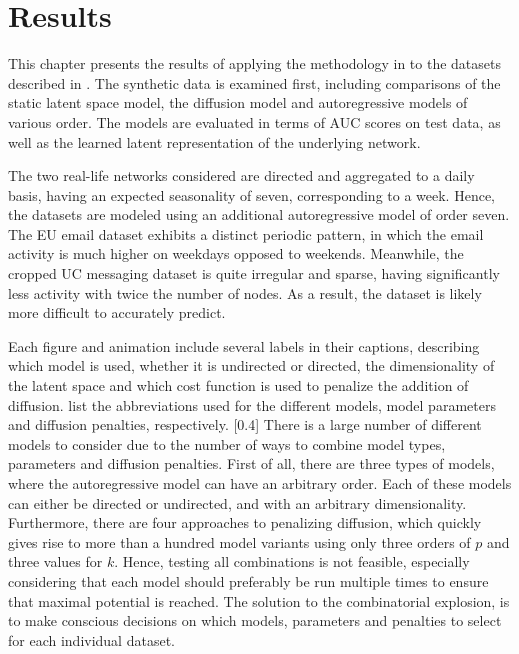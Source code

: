 \chapter{Results}\label{ch:Results}

This chapter presents the results of applying the methodology in  to the datasets described in . The synthetic data is examined first, including comparisons of the static latent space model, the diffusion model and autoregressive models of various order. The models are evaluated in terms of AUC scores on test data, as well as the learned latent representation of the underlying network. 

The two real-life networks considered are directed and aggregated to a daily basis, having an expected seasonality of seven, corresponding to a week. Hence, the datasets are modeled using an additional autoregressive model of order seven. The EU email dataset exhibits a distinct periodic pattern, in which the email activity is much higher on weekdays opposed to weekends. Meanwhile, the cropped UC messaging dataset is quite irregular and sparse, having significantly less activity with twice the number of nodes. As a result, the dataset is likely more difficult to accurately predict.

Each figure and animation include several labels in their captions, describing which model is used, whether it is undirected or directed, the dimensionality of the latent space and which cost function is used to penalize the addition of diffusion. 
 list the abbreviations used for the different models, model parameters and diffusion penalties, respectively.
[0.4\textwidth]
There is a large number of different models to consider due to the number of ways to combine model types, parameters and diffusion penalties. First of all, there are three types of models, where the autoregressive model can have an arbitrary order. Each of these models can either be directed or undirected, and with an arbitrary dimensionality.
Furthermore, there are four approaches to penalizing diffusion, which quickly gives rise to more than a hundred model variants using only three orders of $p$ and three values for $k$. Hence, testing all combinations is not feasible, especially considering that each model should preferably be run multiple times to ensure that maximal potential is reached. The solution to the combinatorial explosion, is to make conscious decisions on which models, parameters and penalties to select for each individual dataset.





